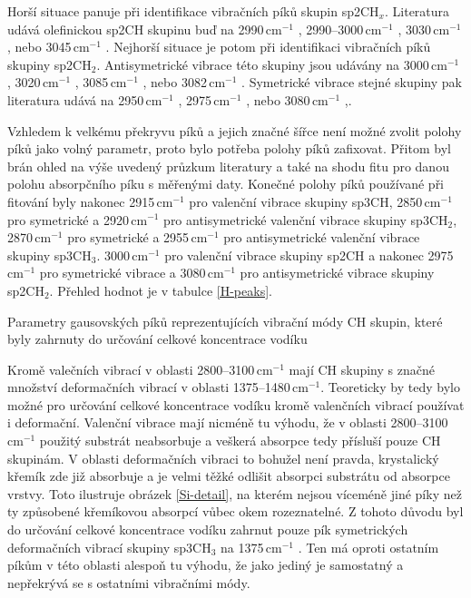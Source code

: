 Horší situace panuje při identifikace vibračních píků skupin sp2CH$_x$. Literatura udává olefinickou sp2CH skupinu buď na 2990\,cm$^{-1}$ \cite{Ristein1998}, 2990--3000\,cm$^{-1}$ \cite{Robertson2002}, 3030\,cm$^{-1}$ \cite{Zajickova2011}, nebo 3045\,cm$^{-1}$ \cite{Dischler1983}. Nejhorší situace je potom při identifikaci vibračních píků skupiny sp2CH$_2$. Antisymetrické vibrace této skupiny jsou udávány na 3000\,cm$^{-1}$ \cite{Zajickova2011}, 3020\,cm$^{-1}$ \cite{Dischler1983}, 3085\,cm$^{-1}$ \cite{Robertson2002}, nebo 3082\,cm$^{-1}$ \cite{Ristein1998}. Symetrické vibrace stejné skupiny pak literatura udává na 2950\,cm$^{-1}$ \cite{Dischler1983}, 2975\,cm$^{-1}$ \cite{Robertson2002, Ristein1998}, nebo 3080\,cm$^{-1}$ \cite{Zajickova2011},.

Vzhledem k velkému překryvu píků a jejich značné šířce není možné zvolit polohy píků jako volný parametr, proto bylo potřeba polohy píků zafixovat. Přitom byl brán ohled na výše uvedený průzkum literatury a také na shodu fitu pro danou polohu absorpčního píku s měřenými daty. 
Konečné polohy píků používané při fitování byly nakonec 2915\,cm$^{-1}$ pro valenční vibrace skupiny sp3CH, 2850\,cm$^{-1}$ pro symetrické a 2920\,cm$^{-1}$ pro antisymetrické valenční vibrace skupiny sp3CH$_2$, 2870\,cm$^{-1}$ pro symetrické a 2955\,cm$^{-1}$ pro antisymetrické valenční vibrace skupiny sp3CH$_3$. 3000\,cm$^{-1}$ pro valenční vibrace skupiny sp2CH a nakonec 2975\,cm$^{-1}$ pro symetrické vibrace a 3080\,cm$^{-1}$ pro antisymetrické vibrace skupiny sp2CH$_2$. Přehled hodnot je v tabulce \ref{H-peaks}.

\begin{table}[tb]
 \centering
	\renewcommand{\tabcolsep}{2pt}
 
 \caption{Parametry gausovských píků reprezentujících vibrační módy CH skupin, které byly zahrnuty do určování celkové koncentrace vodíku}
\label{H-peaks}
\end{table}

Kromě valečních vibrací v oblasti 2800--3100\,cm$^{-1}$ mají CH skupiny s značné množství deformačních vibrací v oblasti 1375--1480\,cm$^{-1}$. Teoreticky by tedy bylo možné pro určování celkové koncentrace vodíku kromě valenčních vibrací používat i deformační. Valenční vibrace mají nicméně tu výhodu, že v oblasti 2800--3100\,cm$^{-1}$ použitý substrát neabsorbuje a veškerá absorpce tedy přísluší pouze CH skupinám. 
V oblasti deformačních vibraci to bohužel není pravda, krystalický křemík zde již absorbuje a je velmi těžké odlišit absorpci substrátu od absorpce vrstvy. Toto ilustruje obrázek \ref{Si-detail}, na kterém nejsou víceméně jiné píky než ty způsobené křemíkovou absorpcí vůbec okem rozeznatelné. Z tohoto důvodu byl do určování celkové koncentrace vodíku zahrnut pouze pík symetrických deformačních vibrací skupiny sp3CH$_3$ na 1375\,cm$^{-1}$ \cite{Robertson2002}. Ten má oproti ostatním píkům v této oblasti alespoň tu výhodu, že jako jediný je samostatný a nepřekrývá se s ostatními vibračními módy.

